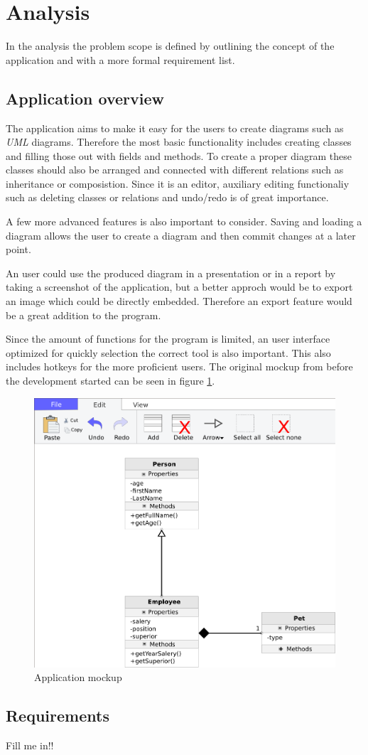 \section{Analysis}
In the analysis the problem scope is defined by outlining the concept of the
application and with a more formal requirement list. 

\subsection{Application overview}
The application aims to make it easy for the users to create diagrams such as
\textit{UML} diagrams. Therefore the most basic functionality includes creating
classes and filling those out with fields and methods. To create a proper
diagram these classes should also be arranged and connected with different
relations such as inheritance or composistion. Since it is an editor, auxiliary
editing functionaliy such as deleting classes or relations and undo/redo is
of great importance. 

A few more advanced features is also important to consider. Saving and loading a
diagram allows the user to create a diagram and then commit changes at a later
point.

An user could use the produced diagram in a presentation or in a report by
taking a screenshot of the application, but a better approch would be to export
an image which could be directly embedded. Therefore an export feature would be
a great addition to the program. 

Since the amount of functions for the program is limited, an user interface
optimized for quickly selection the correct tool is also important. This also
includes hotkeys for the more proficient users. The original mockup from before
the development started can be seen in figure \ref{mockup}.
\begin{figure}[ht!]
\centering
\includegraphics[width=\linewidth]{img/mockup}
\caption{Application mockup \label{mockup}}
\end{figure}

\subsection{Requirements}
Fill me in!!

